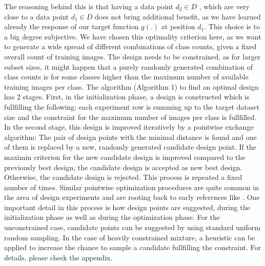 \documentclass{article} %
\begin{document}
The reasoning behind this is that having a data point $d_2 \in D$ , which are very close to a data point $d_1 \in D$ does not bring additional benefit, as we have learned already the response of
our target function $g(.)$ at position $d_1$.
This choice is to a big degree subjective. We have chosen this optimality criterion here, as we want to generate a wide spread of different combinations of class counts, given a fixed overall count of training images.
The design needs to be constrained, as for larger subset sizes, it might happen that a purely randomly generated combination of class counts is for some classes higher than the maximum number of available training images per class.
The algorithm (Algorithm 1) to find an optimal design has 2 stages. First, in the initialization phase, a design is constructed which is fullfilling the following: 
each experiment row is summing up to the target dataset size and the constraint for the maximum number of images per class is fullfilled.
In the second stage, this design is improved iteratively by a pointwise exchange algorithm: The pair of design points with the minimal distance is found and one of them is replaced by a new, randomly generated candidate design point.
If the maximin criterion for the new candidate design is improved compared to the previously best design, the candidate design is accepted as new best design.
Otherwise, the candidate design is rejected. This process is repeated a fixed number of times.
Similar pointwise optimization procedures are quite common in the area of design experiments and are rooting back to early references like \cite{fedorov1972theory}.
One important detail in this process is how design points are suggested, during the initialization phase as well as during the optimization phase.
For the unconstrained case, candidate points can be suggested by using standard uniform random sampling. In the case of heavily constrained mixture, a heuristic can be applied to increase the chance to sample a candidate fullfilling the constraint. For details, please check the appendix.
\end{document}
